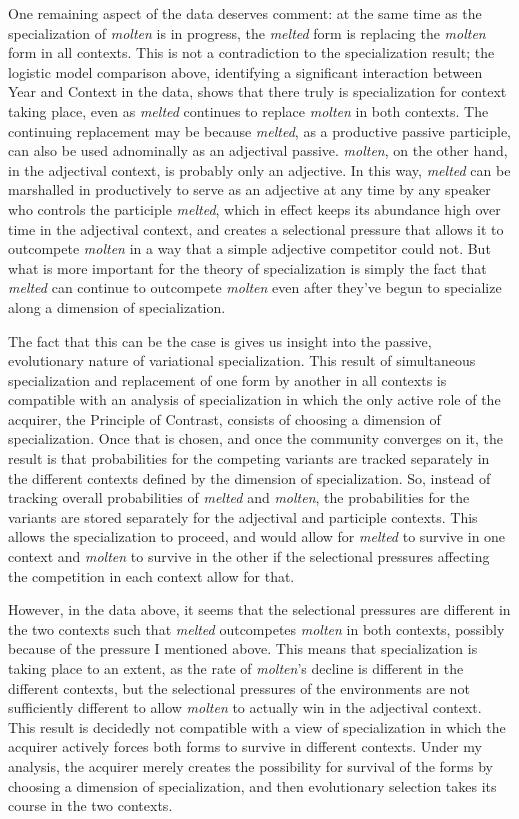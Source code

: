 \documentclass{artikel3}
\begin{document}
One remaining aspect of the data deserves comment: at the same time as the specialization of \textsl{molten} is in progress, the \textsl{melted} form is replacing the \textsl{molten} form in all contexts. This is not a contradiction to the specialization result; the logistic model comparison above, identifying a significant interaction between Year and Context in the data, shows that there truly is specialization for context taking place, even as \textsl{melted} continues to replace \textsl{molten} in both contexts. The continuing replacement may be because \textsl{melted}, as a productive passive participle, can also be used adnominally as an adjectival passive. \textsl{molten}, on the other hand, in the adjectival context, is probably only an adjective. In this way, \textsl{melted} can be marshalled in productively to serve as an adjective at any time by any speaker who controls the participle \textsl{melted}, which in effect keeps its abundance high over time in the adjectival context, and creates a selectional pressure that allows it to outcompete \textsl{molten} in a way that a simple adjective competitor could not. But what is more important for the theory of specialization is simply the fact that \textsl{melted} can continue to outcompete \textsl{molten} even after they've begun to specialize along a dimension of specialization.

The fact that this can be the case is gives us insight into the passive, evolutionary nature of variational specialization. This result of simultaneous specialization and replacement of one form by another in all contexts is compatible with an analysis of specialization in which the only active role of the acquirer, the Principle of Contrast, consists of choosing a dimension of specialization. Once that is chosen, and once the community converges on it, the result is that probabilities for the competing variants are tracked separately in the different contexts defined by the dimension of specialization. So, instead of tracking overall probabilities of \textsl{melted} and \textsl{molten}, the probabilities for the variants are stored separately for the adjectival and participle contexts. This allows the specialization to proceed, and would allow for \textsl{melted} to survive in one context and \textsl{molten} to survive in the other if the selectional pressures affecting the competition in each context allow for that.

However, in the data above, it seems that the selectional pressures are different in the two contexts such that \textsl{melted} outcompetes \textsl{molten} in both contexts, possibly because of the pressure I mentioned above. This means that specialization is taking place to an extent, as the rate of \textsl{molten}'s decline is different in the different contexts, but the selectional pressures of the environments are not sufficiently different to allow \textsl{molten} to actually win in the adjectival context. This result is decidedly not compatible with a view of specialization in which the acquirer actively forces both forms to survive in different contexts. Under my analysis, the acquirer merely creates the possibility for survival of the forms by choosing a dimension of specialization, and then evolutionary selection takes its course in the two contexts.
\end{document}
